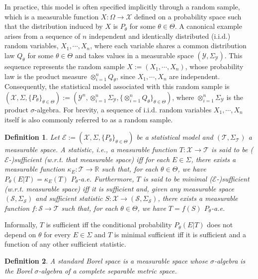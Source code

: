 \documentclass[12pt]{article}
\newtheorem{definition}{Definition}[section]
\begin{document}
In practice, this model is often specified implicitly through a random sample, which is a measurable function $X:\Omega\to \mathcal{X}$ defined on a probability space such that the distribution induced by $X$ is $P_\theta$ for some $\theta\in\Theta$. A canonical example arises from a sequence of $n$ independent and identically distributed (i.i.d.) random variables, $X_1,\cdots, X_n$, where each variable shares a common distribution law $Q_\theta $ for some $\theta\in\Theta$ and takes values in a measurable space $(\mathcal{Y},\Sigma_\mathcal{Y} )$. This sequence represents the random sample $X:=(X_1,\cdots,X_n)$, whose probability law is the product measure $\otimes _{i=1}^nQ_\theta$, since $X_1,\cdots, X_n$ are independent. Consequently, the statistical model associated with this random sample is $(\mathcal{X},\Sigma,\{P_\theta\}_{\theta\in\Theta }):=(\mathcal{Y}^n,\otimes _{i=1}^n\Sigma_\mathcal{Y} ,\{\otimes _{i=1}^nQ_\theta\}_{\theta\in\Theta} )$, where $\otimes _{i=1}^n\Sigma _\mathcal{Y}$ is the product $\sigma$-algebra. For brevity, a sequence of i.i.d. random variables $X_1,\cdots,X_n$ itself is also commonly referred to as a random sample.


\begin{definition}\label{def:suff}
Let $\mathcal{E}:=(\mathcal{X},\Sigma,\{P_\theta\}_{\theta\in\Theta })$ be a statistical model and $(\mathcal{T},\Sigma _\mathcal{T})$ a measurable space. A statistic, i.e., a measurable function $T:\mathcal{X}\to \mathcal{T}$ is said to be ($\mathcal{E}$-)sufficient (w.r.t. that measurable space) iff for each $E\in \Sigma $, there exists a measurable function $\kappa _E:\mathcal{T}\to \mathbb{R}$ such that, for each $\theta\in\Theta$, we have $P_\theta (E|T)=\kappa _E(T)$ $P_\theta$-a.e. Furthermore, $T$ is said to be minimal ($\mathcal{E}$-)sufficient (w.r.t. measurable space) iff it is sufficient and, given any measurable space $(\mathcal{S},\Sigma _\mathcal{S})$ and sufficient statistic $S:\mathcal{X}\to (\mathcal{S},\Sigma _\mathcal{S})$, there exists a measurable function $f:\mathcal{S}\to \mathcal{T}$ such that, for each $\theta\in\Theta$, we have $T=f(S)$ $P_\theta$-a.e.
\end{definition}

Informally, $T$ is sufficient iff the conditional probability $P_\theta (E|T)$ does not depend on $\theta$ for every $E\in \Sigma$ and $T$ is minimal sufficient iff it is sufficient and a function of any other sufficient statistic.


\begin{definition}\label{def:stand_Borel}
A standard Borel space is a measurable space whose $\sigma$-algebra is the Borel $\sigma$-algebra of a complete separable metric space.
\end{definition}
\end{document}
